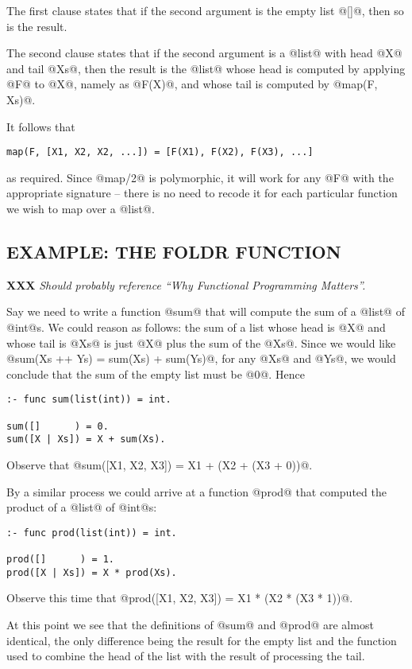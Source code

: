 \documentclass[a4paper,11pt,notitlepage,onecolumn]{article}
\newcommand{\XXX}[1]%
{{\small\textbf{XXX} \emph{#1}}}
\begin{document}
The first clause states that if the second argument is the empty list
@[]@, then so is the result.

The second clause states that if the second argument is a @list@ with head
@X@ and tail @Xs@, then the result is the @list@ whose head is computed by
applying @F@ to @X@, namely as @F(X)@, and whose tail is computed by
@map(F, Xs)@.

It follows that
\begin{verbatim}
map(F, [X1, X2, X2, ...]) = [F(X1), F(X2), F(X3), ...]
\end{verbatim}
as required.  Since @map/2@ is polymorphic, it will work for any @F@
with the appropriate signature -- there is no need to recode it for each
particular function we wish to map over a @list@.

\subsection{EXAMPLE: THE FOLDR FUNCTION}

\XXX{Should probably reference ``Why Functional Programming Matters''.}

Say we need to write a function @sum@ that will compute the sum of a
@list@ of @int@s.  We could reason as follows: the sum of a list whose
head is @X@ and whose tail is @Xs@ is just @X@ plus the sum of the @Xs@.
Since we would like @sum(Xs ++ Ys) = sum(Xs) + sum(Ys)@, for any @Xs@
and @Ys@, we would conclude that the sum of the empty list must be @0@.
Hence
\begin{verbatim}
:- func sum(list(int)) = int.

sum([]      ) = 0.
sum([X | Xs]) = X + sum(Xs).
\end{verbatim}
Observe that @sum([X1, X2, X3]) = X1 + (X2 + (X3 + 0))@.

By a similar process we could arrive at a function @prod@ that computed
the product of a @list@ of @int@s:
\begin{verbatim}
:- func prod(list(int)) = int.

prod([]      ) = 1.
prod([X | Xs]) = X * prod(Xs).
\end{verbatim}
Observe this time that @prod([X1, X2, X3]) = X1 * (X2 * (X3 * 1))@.

At this point we see that the definitions of @sum@ and @prod@ are almost
identical, the only difference being the result for the empty list and
the function used to combine the head of the list with the result of
processing the tail.
\end{document}
